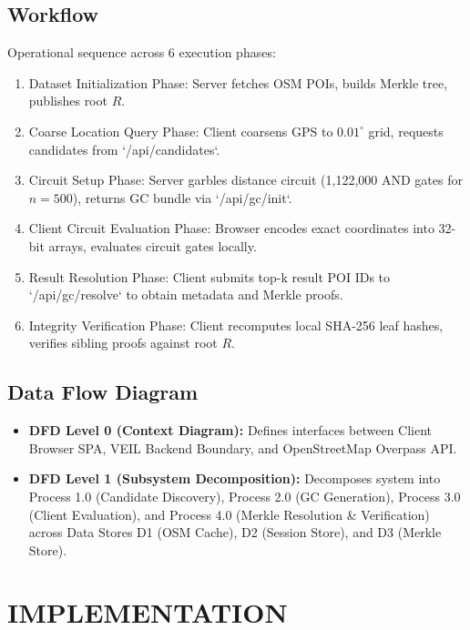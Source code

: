 \documentclass[12pt,a4paper,oneside]{report}
\begin{document}
\section{Workflow}
Operational sequence across 6 execution phases:
\begin{enumerate}
    \item Dataset Initialization Phase: Server fetches OSM POIs, builds Merkle tree, publishes root $R$.
    \item Coarse Location Query Phase: Client coarsens GPS to $0.01^\circ$ grid, requests candidates from `/api/candidates`.
    \item Circuit Setup Phase: Server garbles distance circuit (1,122,000 AND gates for $n=500$), returns GC bundle via `/api/gc/init`.
    \item Client Circuit Evaluation Phase: Browser encodes exact coordinates into 32-bit arrays, evaluates circuit gates locally.
    \item Result Resolution Phase: Client submits top-k result POI IDs to `/api/gc/resolve` to obtain metadata and Merkle proofs.
    \item Integrity Verification Phase: Client recomputes local SHA-256 leaf hashes, verifies sibling proofs against root $R$.
\end{enumerate}

\section{Data Flow Diagram}
\begin{itemize}
    \item \textbf{DFD Level 0 (Context Diagram):} Defines interfaces between Client Browser SPA, VEIL Backend Boundary, and OpenStreetMap Overpass API.
    \item \textbf{DFD Level 1 (Subsystem Decomposition):} Decomposes system into Process 1.0 (Candidate Discovery), Process 2.0 (GC Generation), Process 3.0 (Client Evaluation), and Process 4.0 (Merkle Resolution \& Verification) across Data Stores D1 (OSM Cache), D2 (Session Store), and D3 (Merkle Store).
\end{itemize}


\chapter{IMPLEMENTATION}
\end{document}
